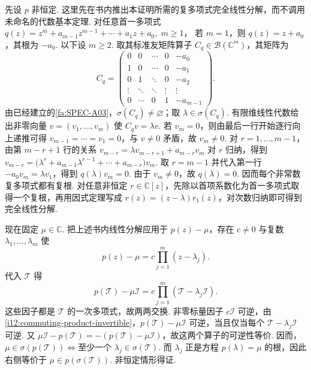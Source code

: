 \begin{FAProof}
先设 \(\displaystyle p\) 非恒定. 这里先在书内推出本证明所需的复多项式完全线性分解，而不调用未命名的代数基本定理. 对任意首一多项式
\(\displaystyle q(z)=z^m+a_{m-1}z^{m-1}+\cdots+a_1z+a_0, \; m\geqslant1\)，
若 \(\displaystyle m=1\)，则 \(\displaystyle q(z)=z+a_0\)，其根为 \(\displaystyle -a_0\). 以下设 \(\displaystyle m\geqslant2\). 取其标准友矩阵算子 \(\displaystyle C_q\in\mathcal B(\mathbb C^m)\)，其矩阵为
\[
C_q=
\begin{pmatrix}
0&0&\cdots&0&-a_0\\
1&0&\cdots&0&-a_1\\
0&1&\ddots&0&-a_2\\
\vdots&\ddots&\ddots&\vdots&\vdots\\
0&\cdots&0&1&-a_{m-1}
\end{pmatrix}.
\]
由已经建立的\autoref{fa:SPEC-A03}，\(\displaystyle \sigma(C_q)\neq\varnothing\)；取 \(\displaystyle \lambda\in\sigma(C_q)\). 有限维线性代数给出非零向量 \(\displaystyle v=(v_1,\dots,v_m)\) 使 \(\displaystyle C_qv=\lambda v\). 若 \(\displaystyle v_m=0\)，则由最后一行开始逐行向上递推可得 \(\displaystyle v_{m-1}=\cdots=v_1=0\)，与 \(\displaystyle v\neq0\) 矛盾，故 \(\displaystyle v_m\neq0\). 对 \(\displaystyle r=1,\dots,m-1\)，由第 \(\displaystyle m-r+1\) 行的关系
\(\displaystyle v_{m-r}=\lambda v_{m-r+1}+a_{m-r}v_m\) 对 \(\displaystyle r\) 归纳，得到
\(\displaystyle v_{m-r} = \bigl(\lambda^r+a_{m-1}\lambda^{r-1}+\cdots+a_{m-r}\bigr)v_m\).
取 \(\displaystyle r=m-1\) 并代入第一行 \(\displaystyle -a_0v_m=\lambda v_1\)，得到 \(\displaystyle q(\lambda)v_m=0\). 由于 \(\displaystyle v_m\neq0\)，故 \(\displaystyle q(\lambda)=0\). 因而每个非常数复多项式都有复根. 对任意非恒定 \(\displaystyle r\in\mathbb C[z]\)，先除以首项系数化为首一多项式取得一个复根，再用因式定理写成 \(\displaystyle r(z)=(z-\lambda)r_1(z)\)，对次数归纳即可得到完全线性分解.

现在固定 \(\displaystyle \mu\in\mathbb C\). 把上述书内线性分解应用于 \(\displaystyle p(z)-\mu\)，存在 \(\displaystyle c\neq0\) 与复数 \(\displaystyle \lambda_1,\dots,\lambda_m\) 使
\[
p(z)-\mu
=
c\prod_{j=1}^{m}(z-\lambda_j).
\]
代入 \(\displaystyle \mathcal T\) 得
\[
p(\mathcal T)-\mu\mathcal I
=
c\prod_{j=1}^{m}
(\mathcal T-\lambda_j\mathcal I).
\]
这些因子都是 \(\displaystyle \mathcal T\) 的一次多项式，故两两交换. 非零标量因子 \(\displaystyle c\mathcal I\) 可逆，由\autoref{i12:commuting-product-invertible}，\(\displaystyle p(\mathcal T)-\mu\mathcal I\) 可逆，当且仅当每个 \(\displaystyle \mathcal T-\lambda_j\mathcal I\) 可逆. 又 \(\displaystyle \mu\mathcal I-p(\mathcal T)=-(p(\mathcal T)-\mu\mathcal I)\)，故这两个算子的可逆性等价. 因而，
\(\displaystyle \mu\in\sigma(p(\mathcal T)) \iff \text{至少一个 }\lambda_j\in\sigma(\mathcal T)\).
而 \(\displaystyle \lambda_j\) 正是方程 \(\displaystyle p(\lambda)=\mu\) 的根，因此右侧等价于 \(\displaystyle \mu\in p(\sigma(\mathcal T))\). 非恒定情形得证.


\end{FAProof}
